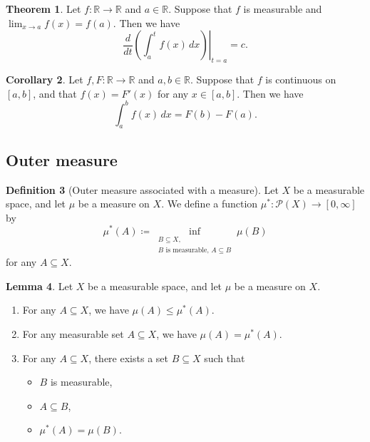 \documentclass{article}
\theoremstyle{definition}
\newtheorem{theorem}{Theorem}[section]
\newtheorem{corollary}[theorem]{Corollary}
\newtheorem{lemma}[theorem]{Lemma}
\newtheorem{definition}[theorem]{Definition}
\begin{document}
\begin{theorem}
  Let $f : \mathbb{R} \to \mathbb{R}$ and $a \in \mathbb{R}$.
  Suppose that 
  $f$ is measurable and
  $\lim_{x \to a} f(x) = f(a)$.
  Then we have
  \begin{equation*}
    \frac{d}{dt} \left. \left( \int_a^{t} f(x) \, dx \right)\right|_{t = a} = c.
  \end{equation*}
\end{theorem}

\begin{corollary}
  Let $f, F: \mathbb{R} \to \mathbb{R}$ and $a , b \in \mathbb{R}$.
  Suppose that $f$ is continuous on $[a, b]$,
  and that $f(x) = F'(x)$ for any $x \in [a, b]$.
  Then we have
  \begin{equation*}
    \int_a^b f(x) \, dx = F(b) - F(a).
  \end{equation*}
\end{corollary}

\subsection{Outer measure}

\begin{definition}[Outer measure associated with a measure]
  Let $X$ be a measurable space,
  and let $\mu$ be a measure on $X$.
  We define a function $\mu^* : \mathcal{P}(X) \to [0, \infty]$ by
  \begin{equation*}
    \mu^* (A) \coloneqq \inf_{\substack{B \subseteq X,\\ \text{$B$ is measurable},\, A \subseteq B}} \mu(B)
  \end{equation*}
  for any $A \subseteq X$.
\end{definition}

\begin{lemma}
  Let $X$ be a measurable space,
  and let $\mu$ be a measure on $X$.
  \begin{enumerate}
    \item For any $A \subseteq X$, we have $\mu (A) \leq \mu^* (A)$.
    \item For any measurable set $A \subseteq X$, we have $\mu (A) = \mu^* (A)$.
    \item For any $A \subseteq X$,
      there exists a set $B \subseteq X$ such that
      \begin{itemize}
        \item $B$ is measurable,
        \item $A \subseteq B$,
        \item $\mu^* (A) = \mu (B)$.
      \end{itemize}
  \end{enumerate}
\end{lemma}
\end{document}
